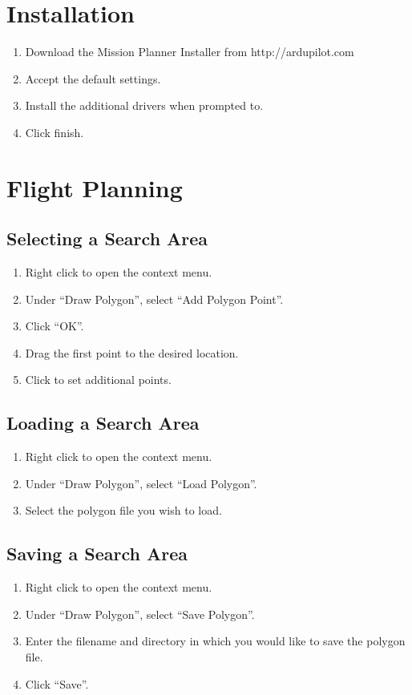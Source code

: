 \documentclass{report}
\begin{document}
	\section{Installation}
		\begin{enumerate}
			\item Download the Mission Planner Installer from http://ardupilot.com
			\item Accept the default settings.
			\item Install the additional drivers when prompted to.
			\item Click finish.
		\end{enumerate}
	\section{Flight Planning}
		\subsection{Selecting a Search Area}
			\begin{enumerate}
				\item Right click to open the context menu.
				\item Under ``Draw Polygon'', select ``Add Polygon Point''.
				\item Click ``OK''.
				\item Drag the first point to the desired location.
				\item Click to set additional points.
			\end{enumerate}
		\subsection{Loading a Search Area}
			\begin{enumerate}
				\item Right click to open the context menu.
				\item Under ``Draw Polygon'', select ``Load Polygon''.
				\item Select the polygon file you wish to load.
			\end{enumerate}
		\subsection{Saving a Search Area}
			\begin{enumerate}
				\item Right click to open the context menu.
				\item Under ``Draw Polygon'', select ``Save Polygon''.
				\item Enter the filename and directory in which you would like to save the polygon file.
				\item Click ``Save''.
			\end{enumerate}
\end{document}
